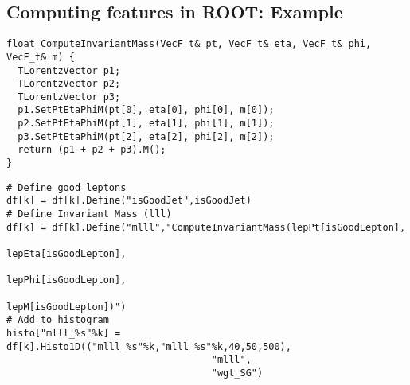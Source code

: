 \subsection{Computing features in ROOT: Example}
\lstset{style=Cpp}
\begin{lstlisting}
float ComputeInvariantMass(VecF_t& pt, VecF_t& eta, VecF_t& phi, VecF_t& m) {
  TLorentzVector p1;
  TLorentzVector p2;
  TLorentzVector p3;
  p1.SetPtEtaPhiM(pt[0], eta[0], phi[0], m[0]);
  p2.SetPtEtaPhiM(pt[1], eta[1], phi[1], m[1]);
  p3.SetPtEtaPhiM(pt[2], eta[2], phi[2], m[2]);
  return (p1 + p2 + p3).M();
}
\end{lstlisting}

\lstset{style=Python}
\begin{lstlisting}
# Define good leptons
df[k] = df[k].Define("isGoodJet",isGoodJet)
# Define Invariant Mass (lll)
df[k] = df[k].Define("mlll","ComputeInvariantMass(lepPt[isGoodLepton], 
                                                    lepEta[isGoodLepton], 
                                                    lepPhi[isGoodLepton], 
                                                    lepM[isGoodLepton])")
# Add to histogram
histo["mlll_%s"%k] = df[k].Histo1D(("mlll_%s"%k,"mlll_%s"%k,40,50,500),
                                    "mlll",
                                    "wgt_SG")     
\end{lstlisting}

